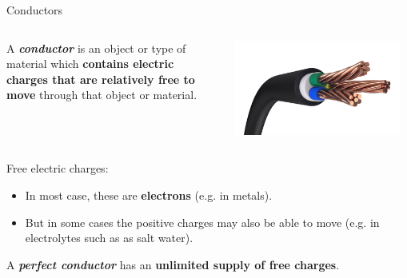 
%
%
%

\begin{frame}{Conductors}

\begin{columns}
  \begin{column}{0.70\textwidth}
    A {\bf {\em conductor}} is an object or type of material
    which {\bf contains electric charges that are relatively free to move} through that object or material.\\
  \end{column}
  \begin{column}{0.30\textwidth}
     \includegraphics[width=0.95\textwidth]{./images/photos/power_cable_01.jpg}\\
  \end{column}
\end{columns}

\vspace{0.3cm}

Free electric charges:
\begin{itemize}
  \item In most case, these are {\bf electrons} (e.g. in metals).
  \item But in some cases the positive charges may also be able to move (e.g. in electrolytes such as as salt water).
\end{itemize}

\vspace{0.3cm}
A {\em \bf perfect conductor} has an {\bf unlimited supply of free charges}.

\end{frame}

%
%
%

